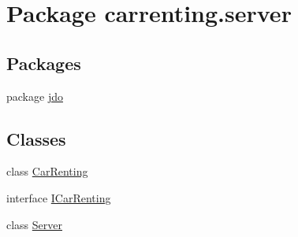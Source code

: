 \hypertarget{namespacecarrenting_1_1server}{}\section{Package carrenting.\+server}
\label{namespacecarrenting_1_1server}
\subsection*{Packages}
\begin{DoxyCompactItemize}
\item 
package \mbox{\hyperlink{namespacecarrenting_1_1server_1_1jdo}{jdo}}
\end{DoxyCompactItemize}
\subsection*{Classes}
\begin{DoxyCompactItemize}
\item 
class \mbox{\hyperlink{classcarrenting_1_1server_1_1_car_renting}{Car\+Renting}}
\item 
interface \mbox{\hyperlink{interfacecarrenting_1_1server_1_1_i_car_renting}{I\+Car\+Renting}}
\item 
class \mbox{\hyperlink{classcarrenting_1_1server_1_1_server}{Server}}
\end{DoxyCompactItemize}
